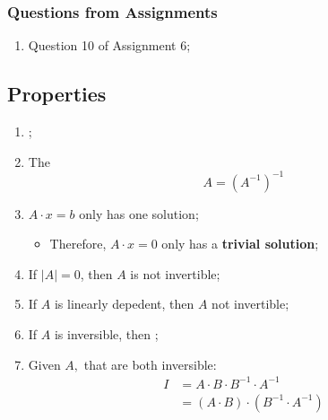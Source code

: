   \subsubsection{Questions from Assignments}
  \begin{enumerate}
    \item Question 10 of Assignment 6;
  \end{enumerate}

\subsection{Properties}
  
  \begin{enumerate}
    \item {};
    
    \item The 
    \begin{displaymath}
      A = \left( A^{-1} \right)^{-1}
    \end{displaymath}
    
    \item $ A \cdot x = b $ only has one solution;
    \begin{itemize}
      \item Therefore, $ A \cdot x = 0 $ only has a \textbf{trivial solution};
    \end{itemize}
    
    \item If $ \left| A \right| = 0 $, then $ A $ is not invertible;
    \item If $ A $ is linearly depedent, then $ A $ not invertible;
    
    \item If $ A $ is inversible, then ;

    \item Given $ A, $ that are both inversible:
    \begin{align*}
      I &= A \cdot B \cdot B^{-1} \cdot A^{-1} \\ 
      &= \left( A \cdot B \right) \cdot \left( B^{-1} \cdot A^{-1} \right)
    \end{align*}
    

\end{enumerate}
